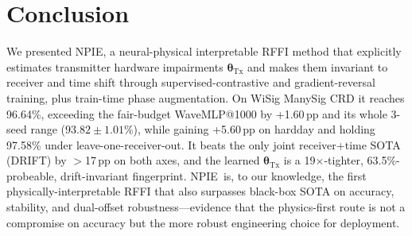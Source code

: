 \documentclass[journal]{IEEEtran}
\newcommand{\npie}{\textsc{NPIE}}
\newcommand{\tx}{\boldsymbol{\theta}_{\mathrm{Tx}}}
\begin{document}
\section{Conclusion}
\label{sec:conclusion}
We presented \npie, a neural-physical interpretable RFFI method that explicitly estimates transmitter hardware impairments $\tx$ and makes them invariant to receiver and time shift through supervised-contrastive and gradient-reversal training, plus train-time phase augmentation. On WiSig ManySig CRD it reaches 96.64\%, exceeding the fair-budget WaveMLP@1000 by +1.60\,pp and its whole 3-seed range ($93.82\pm1.01\%$), while gaining +5.60\,pp on hardday and holding 97.58\% under leave-one-receiver-out. It beats the only joint receiver+time SOTA (DRIFT) by $>$17\,pp on both axes, and the learned $\tx$ is a 19$\times$-tighter, 63.5\%-probeable, drift-invariant fingerprint. \npie\ is, to our knowledge, the first physically-interpretable RFFI that also surpasses black-box SOTA on accuracy, stability, and dual-offset robustness---evidence that the physics-first route is not a compromise on accuracy but the more robust engineering choice for deployment.



\end{document}

